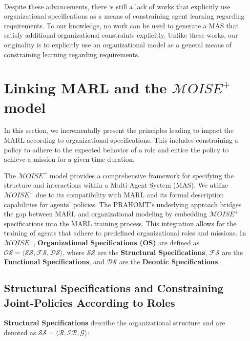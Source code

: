 \documentclass[runningheads]{llncs}
\theoremstyle{freethm}
\theoremstyle{proofoutline}
\begin{document}
\

Despite these advancements, there is still a lack of works that explicitly use organizational specifications as a means of constraining agent learning regarding requirements. To our knowledge, no work can be used to generate a MAS that satisfy additional organizational constraints explicitly. Unlike these works, our originality is to explicitly use an organizational model as a general means of constraining learning regarding requirements.


\section{Linking MARL and the $\mathcal{M}OISE^+$ model}\label{sec:linking_marl_moise}
\label{sec:marl_moise_linking}

In this section, we incrementally present the principles leading to impact the MARL according to organizational specifications. This includes constraining a policy to adhere to the expected behavior of a role and entice the policy to achieve a mission for a given time duration.


The $\mathcal{M}OISE^+$ model provides a comprehensive framework for specifying the structure and interactions within a Multi-Agent System (MAS). We utilize $\mathcal{M}OISE^+$ due to its compatibility with MARL and its formal description capabilities for agents' policies. The PRAHOMT's underlying approach bridges the gap between MARL and organizational modeling by embedding $\mathcal{M}OISE^+$ specifications into the MARL training process. This integration allows for the training of agents that adhere to predefined organizational roles and missions.
%
In $\mathcal{M}OISE^+$, \textbf{Organizational Specifications (OS)} are defined as $\mathcal{OS} = \langle \mathcal{SS}, \mathcal{FS}, \mathcal{DS} \rangle$, where $\mathcal{SS}$ are the \textbf{Structural Specifications}, $\mathcal{FS}$ are the \textbf{Functional Specifications}, and $\mathcal{DS}$ are the \textbf{Deontic Specifications}.

\subsection{Structural Specifications and Constraining Joint-Policies According to Roles}

\textbf{Structural Specifications} describe the organizational structure and are denoted as $\mathcal{SS} = \langle \mathcal{R}, \mathcal{IR}, \mathcal{G} \rangle$:
\end{document}
